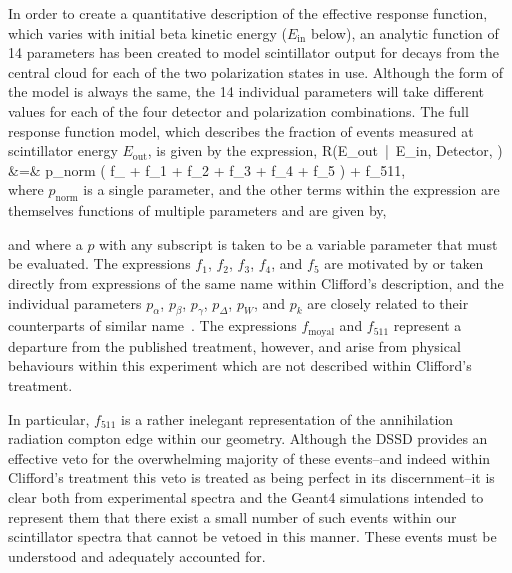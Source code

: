 In order to create a quantitative description of the effective response function, which varies with initial beta kinetic energy ($E_{\textrm{in}}$ below), an analytic function of 14 parameters  has been created to model scintillator output for decays from the central cloud for each of the two polarization states in use.  Although the form of the model is always the same, the 14 individual parameters will take different values for each of the four detector and polarization combinations.  The full response function model, which describes the fraction of events measured at scintillator energy $E_{\textrm{out}}$, is given by the expression,
\bea
	R(E_{\textrm{out}} \,|\, E_{\textrm{in}}, \textrm{Detector}, ) &=& p_{\textrm{norm}} \left( f_{} + f_1 + f_2 + f_3 + f_4 + f_5 \right) + f_{511},
	\nonumber \\
	\label{eq:fullresponsefunction}
\eea
where $p_{\textrm{norm}}$ is a single parameter, and the other terms within the expression are themselves functions of multiple parameters and are given by,



 and
where a $p$ with any subscript is taken to be a variable parameter that must be evaluated.  The expressions $f_1$, $f_2$, $f_3$, $f_4$, and $f_5$ are motivated by or taken directly from expressions of the same name within Clifford's description, and the individual parameters $p_\alpha$, $p_\beta$, $p_\gamma$, $p_\Delta$, $p_W$, and $p_k$ are closely related to their counterparts of similar name~\cite{clifford}.  The expressions $f_{\mathrm{moyal}}$ and $f_{511}$ represent a departure from the published treatment, however, and arise from physical behaviours within this experiment which are not described within Clifford's treatment.

In particular, $f_{511}$ is a rather inelegant representation of the annihilation radiation compton edge within our geometry.  Although the DSSD provides an effective veto for the overwhelming majority of these events--and indeed within Clifford's treatment this veto is treated as being perfect in its discernment--it is clear both from experimental spectra and the Geant4 simulations intended to represent them that there exist a small number of such events within our scintillator spectra that cannot be vetoed in this manner.  These events must be understood and adequately accounted for.  

